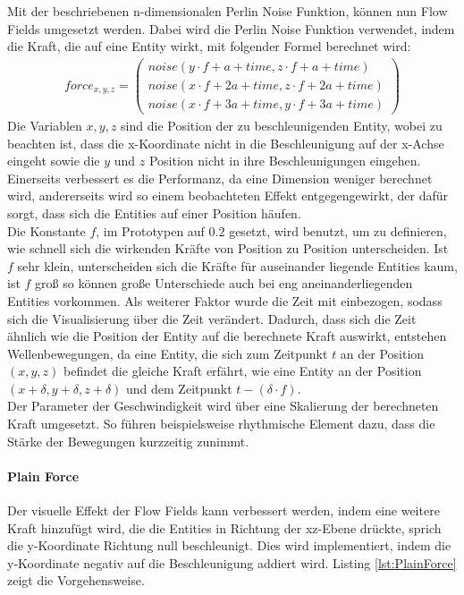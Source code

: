 \documentclass[11pt,a4paper]{article}
\begin{document}
\vspace{10pt}
\noindent
Mit der beschriebenen n-dimensionalen Perlin Noise Funktion, können nun Flow Fields umgesetzt werden. Dabei wird die Perlin Noise Funktion verwendet, indem die Kraft, die auf eine Entity wirkt, mit folgender Formel berechnet wird:
\begin{align}
force_{x,y,z} = \left(
\begin{array}{c}
noise(y \cdot f + a + time, z \cdot f + a + time) \\
noise(x \cdot f + 2a + time, z \cdot f + 2a + time) \\
noise(x \cdot f + 3a + time, y \cdot f + 3a + time)
\end{array}
\right)
\end{align}
\noindent
Die Variablen $x, y, z$ sind die Position der zu beschleunigenden Entity, wobei zu beachten ist, dass die x-Koordinate nicht in die Beschleunigung auf der x-Achse eingeht sowie die $y$ und $z$ Position nicht in ihre Beschleunigungen eingehen. Einerseits verbessert es die Performanz, da eine Dimension weniger berechnet wird, andererseits wird so einem beobachteten Effekt entgegengewirkt, der dafür sorgt, dass sich die Entities auf einer Position häufen.\\
Die Konstante $f$, im Prototypen auf $0.2$ gesetzt, wird benutzt, um zu definieren, wie schnell sich die wirkenden Kräfte von Position zu Position unterscheiden. Ist $f$ sehr klein, unterscheiden sich die Kräfte für auseinander liegende Entities kaum, ist $f$ groß so können große Unterschiede auch bei eng aneinanderliegenden Entities vorkommen. Als weiterer Faktor wurde die Zeit mit einbezogen, sodass sich die Visualisierung über die Zeit verändert. Dadurch, dass sich die Zeit ähnlich wie die Position der Entity auf die berechnete Kraft auswirkt, entstehen Wellenbewegungen, da eine Entity, die sich zum Zeitpunkt $t$ an der Position $(x, y, z)$ befindet die gleiche Kraft erfährt, wie eine Entity an der Position $(x+\delta, y+\delta, z+\delta)$ und dem Zeitpunkt $t-(\delta \cdot f)$.\\
Der Parameter der Geschwindigkeit wird über eine Skalierung der berechneten Kraft umgesetzt. So führen beispielsweise rhythmische Element dazu, dass die Stärke der Bewegungen kurzzeitig zunimmt.

\paragraph{Plain Force}
Der visuelle Effekt der Flow Fields kann verbessert werden, indem eine weitere Kraft hinzufügt wird, die die Entities in Richtung der xz-Ebene drückte, sprich die y-Koordinate Richtung null beschleunigt. Dies wird implementiert, indem die y-Koordinate negativ auf die Beschleunigung addiert wird. Listing \ref{lst:PlainForce} zeigt die Vorgehensweise.
\end{document}
